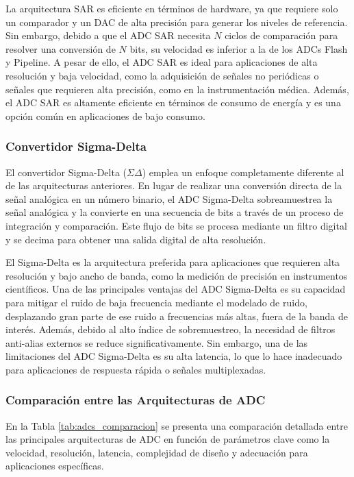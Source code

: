 La arquitectura SAR es eficiente en términos de hardware, ya que requiere solo un comparador y un DAC de alta precisión para generar los niveles de referencia. Sin embargo, debido a que el ADC SAR necesita $N$ ciclos de comparación para resolver una conversión de $N$ bits, su velocidad es inferior a la de los ADCs Flash y Pipeline. A pesar de ello, el ADC SAR es ideal para aplicaciones de alta resolución y baja velocidad, como la adquisición de señales no periódicas o señales que requieren alta precisión, como en la instrumentación médica. Además, el ADC SAR es altamente eficiente en términos de consumo de energía y es una opción común en aplicaciones de bajo consumo.


\subsubsection{Convertidor Sigma-Delta}

El convertidor Sigma-Delta ($\Sigma \Delta$) emplea un enfoque completamente diferente al de las arquitecturas anteriores. En lugar de realizar una conversión directa de la señal analógica en un número binario, el ADC Sigma-Delta sobreamuestrea la señal analógica y la convierte en una secuencia de bits a través de un proceso de integración y comparación. Este flujo de bits se procesa mediante un filtro digital y se decima para obtener una salida digital de alta resolución.

El Sigma-Delta es la arquitectura preferida para aplicaciones que requieren alta resolución y bajo ancho de banda, como la medición de precisión en instrumentos científicos. Una de las principales ventajas del ADC Sigma-Delta es su capacidad para mitigar el ruido de baja frecuencia mediante el modelado de ruido, desplazando gran parte de ese ruido a frecuencias más altas, fuera de la banda de interés. Además, debido al alto índice de sobremuestreo, la necesidad de filtros anti-alias externos se reduce significativamente. Sin embargo, una de las limitaciones del ADC Sigma-Delta es su alta latencia, lo que lo hace inadecuado para aplicaciones de respuesta rápida o señales multiplexadas.

\subsubsection{Comparación entre las Arquitecturas de ADC}

En la Tabla \ref{tab:adcs_comparacion} se presenta una comparación detallada entre las principales arquitecturas de ADC en función de parámetros clave como la velocidad, resolución, latencia, complejidad de diseño y adecuación para aplicaciones específicas.

